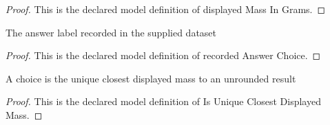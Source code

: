 \begin{proof}
  This is the declared model definition of displayed Mass In Grams.
\end{proof}
\begin{definition}
  \label{def:physics:phyx-mini-0398:phyxminiproblems-problemphyxmini0398-recordedanswerchoice}
  The answer label recorded in the supplied dataset
\end{definition}
\begin{proof}
  This is the declared model definition of recorded Answer Choice.
\end{proof}
\begin{definition}
  \label{def:physics:phyx-mini-0398:phyxminiproblems-problemphyxmini0398-isuniqueclosestdisplayedmass}
  A choice is the unique closest displayed mass to an unrounded result
\end{definition}
\begin{proof}
  This is the declared model definition of Is Unique Closest Displayed Mass.
\end{proof}
